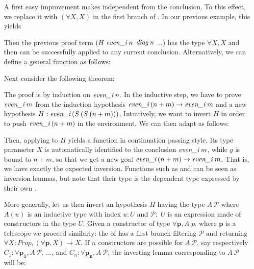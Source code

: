
A first easy improvement makes \diag independent
from the conclusion.
To this effect, we replace it with $(\forall X, X)$ 
in the first branch of \diag.
In our previous example, this yields

\vspace*{.5\baselineskip}


\noindent
Then the previous proof term 
(\match $H$ \intac $\textit{even\_i}\;n$ \retac $\textit{diag}\;n$  $\ldots$)
has the type $\forall X, X$
and then can be successfully applied to any current conclusion.
Alternatively, we can define a general function as follows:


\smallskip
{}


\medskip\noindent
Next consider the following theorem:

\smallskip
{}
\smallskip

\noindent
The proof is by induction on $\textit{even\_i}\;n$.
In the inductive step, we have to prove $\textit{even\_i}\;m$
from the induction hypothesis $\textit{even\_i}\:(n + m) \rightarrow \textit{even\_i}\;m$
and a new hypothesis $H: \textit{even\_i}\: (S\: (S\: (n + m)))$.
Intuitively, we want to invert $H$ in order to push $\textit{even\_i}\:(n + m)$
in the environment. 
We can then adapt \prone as follows:

\smallskip
{}

\noindent
Then, applying \prET to $H$ yields a function in continuation passing style.
Its type parameter $X$ is automatically identified to the conclusion
$\textit{even\_i}\;m$, while $y$ is bound to $n+m$,
so that we get a new goal $\textit{even\_i}\:(n+m) \rightarrow \textit{even\_i}\;m$.
That is, we have exactly the expected inversion.
Functions such as \prone and \prET can be seen as inversion
lemmas, but note that their type is the dependent type
expressed by their own \diag.
\medskip

More generally,
let us then invert an hypothesis $H$ having the type $A\: \mathcal{P}$
where $A(u)$ is an inductive type with index $u:U$
and $\mathcal{P}:\;U$ is an expression made
of constructors in the type $U$.
%
Given a constructor of type $\forall \mathbf{p}, A \;p$, 
where $\mathbf{p}$ is a telescope 
we proceed similarly:
the \match of \diag has a first branch filtering $\mathcal{P}$
and returning 
$\forall X: Prop, (\forall \mathbf{p}, X) \rightarrow X$.
If $n$ constructors are possible for $A \:\mathcal{P}$,
say respectively $C_1: \forall \mathbf{p_1}, A \:\mathcal{P}$,
$\ldots$, and $C_n: \forall \mathbf{p_n}, A \:\mathcal{P}$,
the inverting lemma corresponding to $A \:\mathcal{P}$ will be:

